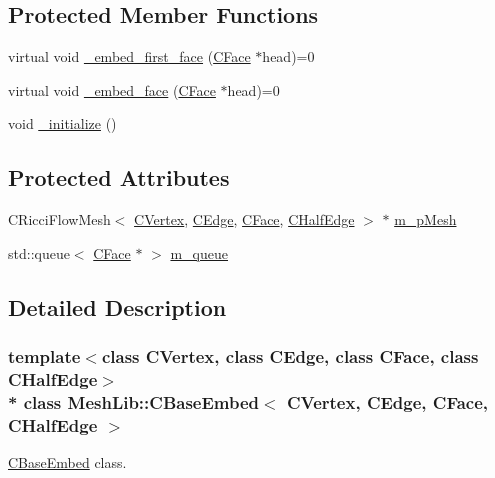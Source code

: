 \subsection*{Protected Member Functions}
\begin{DoxyCompactItemize}
\item 
virtual void \hyperlink{class_mesh_lib_1_1_c_base_embed_a1a05d4cad7181da5a1ccc66265609f89}{\+\_\+embed\+\_\+first\+\_\+face} (\hyperlink{class_mesh_lib_1_1_c_face}{C\+Face} $\ast$head)=0
\item 
virtual void \hyperlink{class_mesh_lib_1_1_c_base_embed_a41a602699326b590a718570141923258}{\+\_\+embed\+\_\+face} (\hyperlink{class_mesh_lib_1_1_c_face}{C\+Face} $\ast$head)=0
\item 
void \hyperlink{class_mesh_lib_1_1_c_base_embed_ab064a0d24575758805edc7829b5e2d6e}{\+\_\+initialize} ()
\end{DoxyCompactItemize}
\subsection*{Protected Attributes}
\begin{DoxyCompactItemize}
\item 
C\+Ricci\+Flow\+Mesh$<$ \hyperlink{class_mesh_lib_1_1_c_vertex}{C\+Vertex}, \hyperlink{class_mesh_lib_1_1_c_edge}{C\+Edge}, \hyperlink{class_mesh_lib_1_1_c_face}{C\+Face}, \hyperlink{class_mesh_lib_1_1_c_half_edge}{C\+Half\+Edge} $>$ $\ast$ \hyperlink{class_mesh_lib_1_1_c_base_embed_a78bc5d476b39b3b3cb0d627de477d2f4}{m\+\_\+p\+Mesh}
\item 
std\+::queue$<$ \hyperlink{class_mesh_lib_1_1_c_face}{C\+Face} $\ast$ $>$ \hyperlink{class_mesh_lib_1_1_c_base_embed_a3ab9dc6044ded5990cd90643b99d8298}{m\+\_\+queue}
\end{DoxyCompactItemize}


\subsection{Detailed Description}
\subsubsection*{template$<$class C\+Vertex, class C\+Edge, class C\+Face, class C\+Half\+Edge$>$\\*
class Mesh\+Lib\+::\+C\+Base\+Embed$<$ C\+Vertex, C\+Edge, C\+Face, C\+Half\+Edge $>$}

\hyperlink{class_mesh_lib_1_1_c_base_embed}{C\+Base\+Embed} class. 

